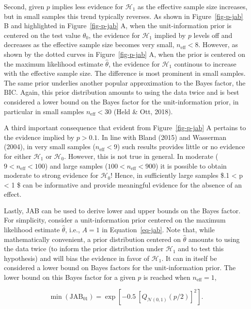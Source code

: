 \documentclass[
  man,
  floatsintext,
  longtable,
  nolmodern,
  notxfonts,
  notimes,
  colorlinks=true,linkcolor=blue,citecolor=blue,urlcolor=blue]{apa7}
\begin{document}
Second, given \(p\) implies less evidence for \(\mathcal{H}_1\) as the
effective sample size increases, but in small samples this trend
typically reverses. As shown in Figure~\ref{fig-p-jab} B and highlighted
in Figure~\ref{fig-p-jab} A, when the unit-information prior is centered
on the test value \(\theta_0\), the evidence for \(\mathcal{H}_1\)
implied by \(p\) levels off and decreases as the effective sample size
becomes very small, \(n_\text{eff} < 8\). However, as shown by the
dotted curves in Figure~\ref{fig-p-jab} A, when the prior is centered on
the maximum likelihood estimate \(\hat\theta\), the evidence for
\(\mathcal{H}_1\) continous to increase with the effective sample size.
The difference is most prominent in small samples. The same prior
underlies another popular approximation to the Bayes factor, the
\(\text{BIC}\). Again, this prior distribution amounts to using the data
twice and is best considered a lower bound on the Bayes factor for the
unit-information prior, in particular in small samples
\(n_\text{eff} < 30\) (Held \& Ott, 2018).

A third important consequence that evident from Figure~\ref{fig-p-jab} A
pertains to the evidence implied by \(p > 0.1\). In line with Bland
(2015) and Wasserman (2004), in very small samples
(\(n_\text{eff} < 9\)) such results provides little or no evidence for
either \(\mathcal{H}_1\) or \(\mathcal{H}_0\). However, this is not true
in general. In moderate (\(9 < n_\text{eff} < 100\)) and large samples
(\(100 < n_\text{eff} < 900\)) it is possible to obtain moderate to
strong evidence for \(\mathcal{H}_0\)! Hence, in sufficiently large
samples \$.1 \textless{} p \textless{} 1 \$ can be informative and
provide meaningful evidence for the absence of an effect.

Lastly, JAB can be used to derive lower and upper bounds on the Bayes
factor. For simplicity, consider a unit-information prior centered on
the maximum likelihood estimate \(\hat\theta\), i.e., \(A = 1\) in
Equation~\ref{eq-jab}. Note that, while mathematically convenient, a
prior distribution centered on \(\hat\theta\) amounts to using the data
twice (to inform the prior distribution under \(\mathcal{H}_1\) and to
test this hypothesis) and will bias the evidence in favor of
\(\mathcal{H}_1\). It can in itself be considered a lower bound on Bayes
factors for the unit-information prior. The lower bound on this Bayes
factor for a given \(p\) is reached when \(n_\text{eff} = 1\),

\[
\min(\text{JAB}_{01}) = \exp\left[-0.5~\left[Q_{\mathcal{N(0,1)}}(p/2)\right]^2\right].
\]
\end{document}
